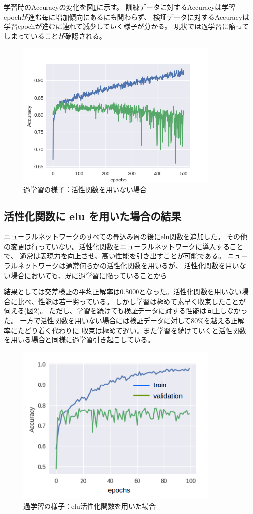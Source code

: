 学習時のAccuracyの変化を図\ref{fig:overfit1}に示す。
訓練データに対するAccuracyは学習epochが進む毎に増加傾向にあるにも関わらず、
検証データに対するAccuracyは学習epochが進むに連れて減少していく様子が分かる。
現状では過学習に陥ってしまっていることが確認される。
\begin{figure}[t]
    \centering
    \includegraphics[width=10cm]{images/linearof.png}
    \caption{過学習の様子：活性関数を用いない場合}
    \label{fig:overfit1}
\end{figure}


\subsection{\mc 活性化関数に \rm elu \mc を用いた場合の結果}
ニューラルネットワークのすべての畳込み層の後にelu関数を追加した。
その他の変更は行っていない。活性化関数をニューラルネットワークに導入することで、
通常は表現力を向上させ、高い性能を引き出すことが可能である。
ニューラルネットワークは通常何らかの活性化関数を用いるが、
活性化関数を用いない場合においても、既に過学習に陥っていることから

結果としては交差検証の平均正解率は0.8000となった。活性化関数を用いない場合に比べ、性能は若干劣っている。
しかし学習は極めて素早く収束したことが伺える(図\ref{fig:overfit2})。
ただし、学習を続けても検証データに対する性能は向上しなかった。
一方で活性関数を用いない場合には検証データに対して80\%を越える正解率にたどり着く代わりに
収束は極めて遅い。また学習を続けていくと活性関数を用いる場合と同様に過学習引き起こしている。

\begin{figure}[t]
    \centering
    \includegraphics[width=10cm]{images/overfitting.png}
    \caption{過学習の様子：elu活性化関数を用いた場合}
    \label{fig:overfit2}
\end{figure}

